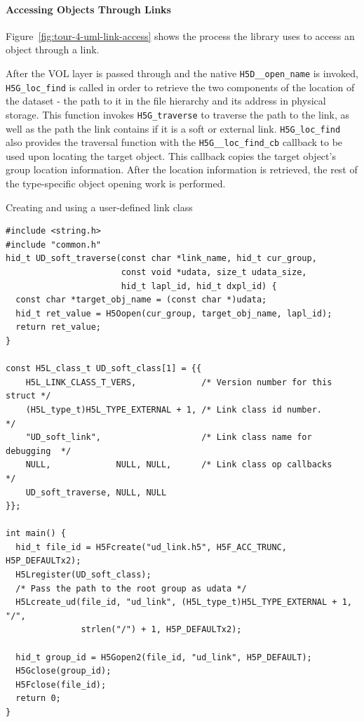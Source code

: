 \paragraph{Accessing Objects Through Links} Figure~\ref{fig:tour-4-uml-link-access} shows the process the library uses to access an object through a link. 

After the VOL layer is passed through and the native \texttt{H5D\_\_open\_name} is invoked, \texttt{H5G\_loc\_find} is called in order to retrieve the two components of the location of the dataset - the path to it in the file hierarchy and its address in physical storage. This function invokes \texttt{H5G\_traverse} to traverse the path to the link, as well as the path the link contains if it is a soft or external link. \texttt{H5G\_loc\_find} also provides the traversal function with the \texttt{H5G\_\_loc\_find\_cb} callback to be used upon locating the target object. This callback copies the target object's group location information. After the location information is retrieved, the rest of the type-specific object opening work is performed. 

\begin{listing}
\centering
\caption{Creating and using a user-defined link class}
\label{lst:ud-link-example}
\begin{verbatim}
#include <string.h>
#include "common.h"
hid_t UD_soft_traverse(const char *link_name, hid_t cur_group,
                       const void *udata, size_t udata_size, 
                       hid_t lapl_id, hid_t dxpl_id) {
  const char *target_obj_name = (const char *)udata;
  hid_t ret_value = H5Oopen(cur_group, target_obj_name, lapl_id);
  return ret_value;
}

const H5L_class_t UD_soft_class[1] = {{
    H5L_LINK_CLASS_T_VERS,             /* Version number for this struct */
    (H5L_type_t)H5L_TYPE_EXTERNAL + 1, /* Link class id number.          */
    "UD_soft_link",                    /* Link class name for debugging  */
    NULL,             NULL, NULL,      /* Link class op callbacks        */
    UD_soft_traverse, NULL, NULL
}};

int main() {
  hid_t file_id = H5Fcreate("ud_link.h5", H5F_ACC_TRUNC, H5P_DEFAULTx2);
  H5Lregister(UD_soft_class);
  /* Pass the path to the root group as udata */
  H5Lcreate_ud(file_id, "ud_link", (H5L_type_t)H5L_TYPE_EXTERNAL + 1, "/",
               strlen("/") + 1, H5P_DEFAULTx2);

  hid_t group_id = H5Gopen2(file_id, "ud_link", H5P_DEFAULT);
  H5Gclose(group_id);
  H5Fclose(file_id);
  return 0;
}

\end{verbatim}
\end{listing}


